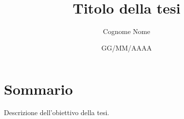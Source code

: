 \documentclass[12pt,a4paper,twoside,openright]{extreport}
\title{Titolo della tesi}
\author{Cognome Nome}
\date{GG/MM/AAAA}
\begin{document}
    \pagestyle{empty} %

    
    \cleardoublepage
    
    
    \cleardoublepage

    \pagestyle{plain} %

    \chapter*{Sommario}
    Descrizione dell'obiettivo della tesi.
    \cleardoublepage

    \tableofcontents
    \cleardoublepage
    
    \listoffigures
    \cleardoublepage %
    

    
    \cleardoublepage

    \printbibliography[heading=bibintoc]
\end{document}
